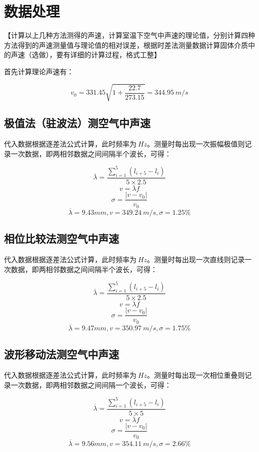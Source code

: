 \documentclass{ctexart}
\begin{document}
\section{数据处理}

【计算以上几种方法测得的声速，计算室温下空气中声速的理论值，分别计算四种方法得到的声速测量值与理论值的相对误差，根据时差法测量数据计算固体介质中的声速（选做），要有详细的计算过程，格式工整】

首先计算理论声速有：

$$ v_0 = 331.45\sqrt{1+\frac{22.7}{273.15}} = 344.95\ m/s $$

\subsection{极值法（驻波法）测空气中声速}

代入数据根据逐差法公式计算，此时频率为$ \ Hz$。测量时每出现一次振幅极值则记录一次数据，即两相邻数据之间间隔半个波长，可得： 

$$ \overline{\lambda} = \frac{\sum\limits_{i=1}^{5}(l_{i+5}-l_i)}{5 \times 2.5} $$
$$ v = \overline{\lambda} f $$
$$ \sigma = \frac{|v - v_0|}{v_0} $$
$$ \overline{\lambda} = 9.43 mm , v = 349.24 \ m/s,\sigma = 1.25\% $$

\subsection{相位比较法测空气中声速}

代入数据根据逐差法公式计算，此时频率为$ \ Hz$。测量时每出现一次直线则记录一次数据，即两相邻数据之间间隔半个波长，可得：

$$ \overline{\lambda} = \frac{\sum\limits_{i=1}^{5}(l_{i+5}-l_i)}{5 \times 2.5} $$
$$ v = \overline{\lambda} f $$
$$ \sigma = \frac{|v - v_0|}{v_0} $$
$$ \overline{\lambda} = 9.47 mm , v = 350.97 \ m/s,\sigma = 1.75\% $$

\subsection{波形移动法测空气中声速}

代入数据根据逐差法公式计算，此时频率为$ \ Hz$。测量时每出现一次相位重叠则记录一次数据，即两相邻数据之间间隔一个波长，可得： 

$$ \overline{\lambda} = \frac{\sum\limits_{i=1}^{5}(l_{i+5}-l_i)}{5 \times 5} $$
$$ v = \overline{\lambda} f $$
$$ \sigma = \frac{|v - v_0|}{v_0} $$
$$ \overline{\lambda} = 9.56 mm , v = 354.11 \ m/s,\sigma = 2.66\% $$
\end{document}
